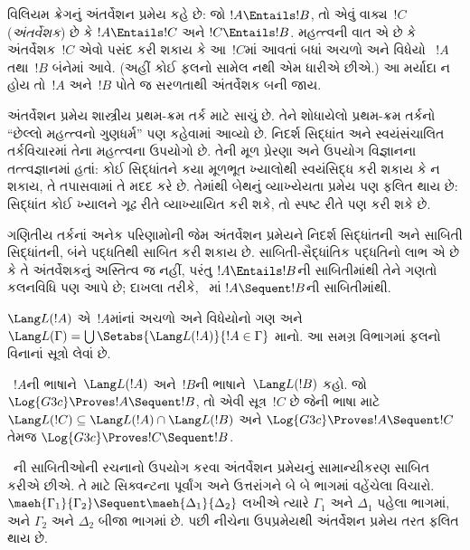 \begingroup
\makeatletter{}\makeatother


\label{guunit:OLP-0658}


વિલિયમ ક્રેગનું અંતર્વેશન પ્રમેય કહે છે:
જો $!A \Entails !B$, તો એવું
વાક્ય~$!C$ (\emph{અંતર્વેશક}) છે કે
$!A \Entails !C$ અને $!C \Entails !B$.
મહત્ત્વની વાત એ છે કે અંતર્વેશક~$!C$
એવો પસંદ કરી શકાય કે આ~$!C$માં આવતાં
બધાં અચળો અને વિધેયો
~$!A$ તથા~$!B$ બંનેમાં આવે.
(અહીં કોઈ ફલનો સામેલ નથી એમ ધારીએ છીએ.)
આ મર્યાદા ન હોય તો~$!A$ અને~$!B$
પોતે જ સરળતાથી અંતર્વેશક બની જાય.

અંતર્વેશન પ્રમેય શાસ્ત્રીય પ્રથમ-ક્રમ
તર્ક માટે સાચું છે. તેને શોધાયેલો
પ્રથમ-ક્રમ તર્કનો ``છેલ્લો મહત્ત્વનો ગુણધર્મ''
પણ કહેવામાં આવ્યો છે.
નિદર્શ સિદ્ધાંત અને સ્વયંસંચાલિત
તર્કવિચારમાં તેના મહત્ત્વના ઉપયોગો છે.
તેની મૂળ પ્રેરણા અને ઉપયોગ વિજ્ઞાનના
તત્ત્વજ્ઞાનમાં હતાં: કોઈ સિદ્ધાંતને
કયા મૂળભૂત ખ્યાલોથી સ્વયંસિદ્ધ કરી શકાય
કે ન શકાય, તે તપાસવામાં તે મદદ કરે છે.
તેમાંથી બેથનું વ્યાખ્યેયતા પ્રમેય પણ
ફલિત થાય છે: સિદ્ધાંત કોઈ ખ્યાલને
ગૂઢ રીતે વ્યાખ્યાયિત કરી શકે,
તો સ્પષ્ટ રીતે પણ કરી શકે છે.

ગણિતીય તર્કનાં અનેક પરિણામોની જેમ
અંતર્વેશન પ્રમેયને નિદર્શ સિદ્ધાંતની
અને સાબિતી સિદ્ધાંતની, બંને પદ્ધતિથી
સાબિત કરી શકાય છે.
સાબિતી-સૈદ્ધાંતિક પદ્ધતિનો લાભ એ છે કે
તે અંતર્વેશકનું અસ્તિત્વ જ નહીં,
પરંતુ $!A \Entails !B$ની
સાબિતીમાંથી તેને ગણતો કલનવિધિ
પણ આપે છે; દાખલા તરીકે,
~માં
$!A \Sequent !B$ની સાબિતીમાંથી.

$\Lang L(!A)$ એ~$!A$માંનાં
અચળો અને વિધેયોનો ગણ
અને
$\Lang L(\Gamma) = \bigcup \Setabs{\Lang L(!A)}{!A \in
\Gamma}$ માનો. આ સમગ્ર વિભાગમાં
ફલનો વિનાનાં સૂત્રો
લેવાં છે.

\begin{thm}[ક્રેગનું અંતર્વેશન પ્રમેય]
~$!A$ની ભાષાને~$\Lang L(!A)$
અને~$!B$ની ભાષાને~$\Lang L(!B)$ કહો.
જો $\Log{G3c} \Proves !A \Sequent !B$,
તો એવી સૂત્ર~$!C$ છે
જેની ભાષા માટે
$\Lang L(!C) \subseteq \Lang
L(!A) \cap \Lang L(!B)$ અને
$\Log{G3c} \Proves !A \Sequent !C$
તેમજ
$\Log{G3c} \Proves !C \Sequent !B$.
\end{thm}

~ની સાબિતીઓની રચનાનો
ઉપયોગ કરવા અંતર્વેશન પ્રમેયનું
સામાન્યીકરણ સાબિત કરીએ છીએ.
તે માટે સિક્વન્ટના પૂર્વાંગ અને
ઉત્તરાંગને બે બે ભાગમાં વહેંચેલા
વિચારો. $\maeh{\Gamma_1}{\Gamma_2} \Sequent
\maeh{\Delta_1}{\Delta_2}$ લખીએ ત્યારે
$\Gamma_1$ અને $\Delta_1$ પહેલા ભાગમાં,
અને $\Gamma_2$ અને $\Delta_2$
બીજા ભાગમાં છે. પછી નીચેના ઉપપ્રમેયથી
અંતર્વેશન પ્રમેય તરત ફલિત થાય છે.

